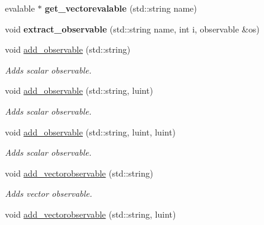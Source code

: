 \begin{CompactItemize}
\item 
\hypertarget{classmeasurements_0665934d799b45c8d1b44596d582e730}{
evalable $\ast$ \textbf{get\_\-vectorevalable} (std::string name)}
\label{classmeasurements_0665934d799b45c8d1b44596d582e730}

\item 
\hypertarget{classmeasurements_c1bc5579105ccf85728a2e3d17231e0b}{
void \textbf{extract\_\-observable} (std::string name, int i, observable \&os)}
\label{classmeasurements_c1bc5579105ccf85728a2e3d17231e0b}

\item 
void \hyperlink{classmeasurements_e44e2ffcf3e14cf741a1192a319aaf20}{add\_\-observable} (std::string)
\begin{CompactList}\small\item\em Adds scalar observable. \item\end{CompactList}\item 
void \hyperlink{classmeasurements_9dc7d64a614f14c55778e9584a5bf793}{add\_\-observable} (std::string, luint)
\begin{CompactList}\small\item\em Adds scalar observable. \item\end{CompactList}\item 
void \hyperlink{classmeasurements_abfc185b78e039b7e17cf2e4ec1c5adb}{add\_\-observable} (std::string, luint, luint)
\begin{CompactList}\small\item\em Adds scalar observable. \item\end{CompactList}\item 
\hypertarget{classmeasurements_fbbcc6b0cbd6a9c34d9fcdb7370cfc87}{
void \hyperlink{classmeasurements_fbbcc6b0cbd6a9c34d9fcdb7370cfc87}{add\_\-vectorobservable} (std::string)}
\label{classmeasurements_fbbcc6b0cbd6a9c34d9fcdb7370cfc87}

\begin{CompactList}\small\item\em Adds vector observable. \item\end{CompactList}\item 
\hypertarget{classmeasurements_64897050112e3f9f7c2f40707397523b}{
void \hyperlink{classmeasurements_64897050112e3f9f7c2f40707397523b}{add\_\-vectorobservable} (std::string, luint)}
\label{classmeasurements_64897050112e3f9f7c2f40707397523b}


\end{CompactItemize}
